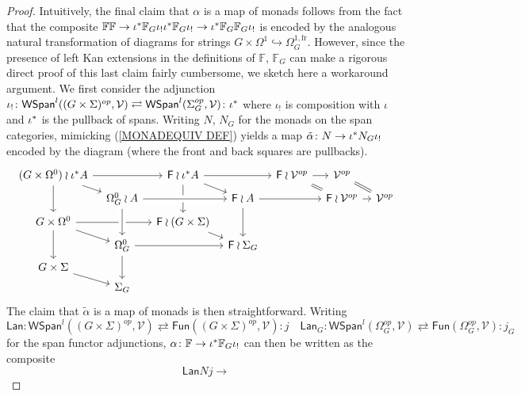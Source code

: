 \documentclass[a4paper,10pt]{article}%
\begin{document}
\begin{proof}
Intuitively, the final claim that 
$\alpha$ is a map of monads 
follows from the fact that the composite 
$
\mathbb{F} \mathbb{F}
	\to 
\iota^{\**} \mathbb{F}_G \iota_{!} \iota^{\**} \mathbb{F}_G \iota_{!}
	\to
\iota^{\**} \mathbb{F}_G \mathbb{F}_G \iota_{!}
$
is encoded by the analogous natural transformation of diagrams for strings $G \times \Omega^1 \hookrightarrow \Omega_{G}^{1,\text{fr}}$.
However, since the presence of left Kan extensions in the 
definitions of $\mathbb{F}$, $\mathbb{F}_G$
can make a rigorous direct proof of this last claim fairly cumbersome, we sketch here a workaround argument.
We first consider the adjunction
$
	\iota_{!} \colon
	\mathsf{WSpan}^l((G\times \Sigma)^{op},\mathcal{V})
		\rightleftarrows
	\mathsf{WSpan}^l(\Sigma_G^{op},\mathcal{V})
	\colon \iota^{\**}
$
where $\iota_!$ is composition with $\iota$ and $\iota^{\**}$ is the pullback of spans. 
Writing $N$, $N_G$ for the monads 
on the span categories, mimicking (\ref{MONADEQUIV DEF}) yields
a map 
$\tilde{\alpha} \colon N \to \iota^{\**} N_G \iota_{!}$
encoded by the diagram (where the front and back squares are pullbacks).
\[
\begin{tikzcd}[row sep=3pt, column sep =8pt]
	(G \times \Omega^0) \wr \iota^{\**} A	\ar{dd} \ar{rd} \ar{rr} &&
	\Fin \wr \iota^{\**} A \ar{rd} \ar{dd} \ar{rr}&&
	\Fin \wr \mathcal{V}^{op} \ar{r} \ar[equal]{rd} &
	\mathcal{V}^{op} \ar[equal]{rd}
\\
	& 
	|[alias=O1]|
	\Omega_{G}^{0} \wr A \ar[crossing over]{rr} &&
	\Fin \wr A \ar{dd} \ar{rr} &&
	\Fin \wr \mathcal{V}^{op} \ar{r} &
	\mathcal{V}^{op}
\\
	G \times \Omega^0	\ar{dd} \ar{rd} \ar{rr}&&
	\Fin \wr (G \times \Sigma) \ar{rd}
\\
	&
	|[alias=O2]|
	\Omega_{G}^{0} \ar{dd} \ar{rr} &&
	\Fin \wr \Sigma_G
\\
	G \times \Sigma \ar{rd}
\\
	& \Sigma_{G}
\arrow[from=O1, to=O2,crossing over]
\end{tikzcd}
\]
The claim that $\tilde{\alpha}$ is a map of monads is then straightforward. Writing
\[
	\mathsf{Lan} \colon
	\mathsf{WSpan}^l((G\times \Sigma)^{op},\mathcal{V})
		\rightleftarrows
	\mathsf{Fun}((G\times \Sigma)^{op},\mathcal{V})
	\colon j
\quad
	\mathsf{Lan}_G \colon
	\mathsf{WSpan}^l(\Omega_G^{op},\mathcal{V})
		\rightleftarrows
	\mathsf{Fun}(\Omega_G^{op},\mathcal{V})
	\colon j_G
\]
for the span functor adjunctions,  
$\alpha \colon \mathbb{F} \to \iota^{\**} \mathbb{F}_G \iota_{!}$ can then be written as the composite
\[
	\mathsf{Lan} N j \to 
\]
\end{proof}
\end{document}
